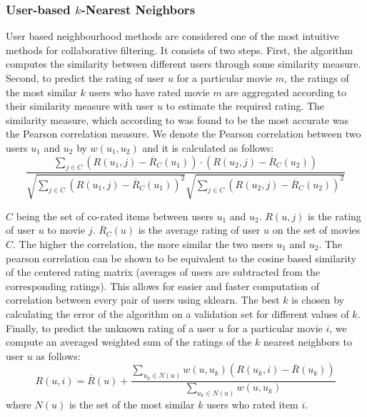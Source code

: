 \documentclass[10pt,conference,compsocconf]{IEEEtran}
\begin{document}
	\subsubsection*{\textbf{User-based $k$-Nearest Neighbors}} User based neighbourhood methods are considered one of the most intuitive methods for collaborative filtering. It consists of two steps. First, the algorithm computes the similarity between different users through some similarity measure. Second, to predict the rating of user $u$ for a particular movie $m$, the ratings of the most similar $k$ users who have rated movie $m$ are aggregated according to their similarity measure with user $u$ to estimate the required rating. The similarity measure, which according to \cite{L10} was found to be the most accurate was the Pearson correlation measure. We denote the Pearson correlation between two users $u_1$ and $u_2$ by $w(u_1, u_2)$ and it is calculated as follows:
	\begin{equation} \label{eqn:pearson}
	\frac{\sum_{j \in C} (R(u_1, j) - \overline{R}_C(u_1))\cdot(R(u_2, j) - \overline{R}_C(u_2))}{\sqrt{\sum_{j \in C} (R(u_1, j) - \overline{R}_C(u_1))^2} \sqrt{\sum_{j \in C} (R(u_2, j) - \overline{R}_C(u_2))^2}}
	\end{equation}
	
	$C$ being the set of co-rated items between users $u_1$ and $u_2$. $R(u,j)$ is the rating of user $u$ to movie $j$. $\overline{R}_C(u)$ is the average rating of user $u$ on the set of movies $C$. The higher the correlation, the more similar the two users $u_1$ and $u_2$. The pearson correlation can be shown \cite{L10} to be equivalent to the cosine based similarity of the centered rating matrix (averages of users are subtracted from the corresponding ratings). This allows for easier and faster computation of correlation between every pair of users using sklearn. The best $k$ is chosen by calculating the error of the algorithm on a validation set for different values of $k$. Finally, to predict the unknown rating of a user $u$ for a particular movie $i$, we compute an averaged weighted sum of the ratings of the $k$ nearest neighbors to user $u$ as follows:
	\begin{equation} \label{eqn:predict_user_based}
	R(u,i) = \overline{R}(u) + \frac{\sum_{u_k \in N(u)} w(u,u_k)(R(u_k,i) - \overline{R}(u_k))}{\sum_{u_k \in N(u)} w(u,u_k)}
	\end{equation}
	where $N(u)$ is the set of the most similar $k$ users who rated item $i$.
	\\
	
\end{document}
